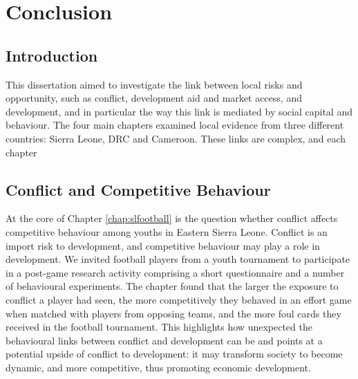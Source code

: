 \chapter{Conclusion}
\label{chap:conclusion}

\section{Introduction}
This dissertation aimed to investigate the link between local risks and opportunity, such as conflict, development aid and market access, and development, and in particular the way this link is mediated by social capital and behaviour. The four main chapters examined local evidence from three different countries: Sierra Leone, DRC and Cameroon. These links are complex, and each chapter






\section{Conflict and Competitive Behaviour}

At the core of Chapter \ref{chap:slfootball} is the question whether conflict affects competitive behaviour among youths in Eastern Sierra Leone. Conflict is an import risk to development, and competitive behaviour may play a role in development. We invited football players from a youth tournament to participate in a post-game research activity comprising a short questionnaire and a number of behavioural experiments. The chapter found that the larger the exposure to conflict a player had seen, the more competitively they behaved in an effort game when matched with players from opposing teams, and the more foul cards they received in the football tournament. This highlights how unexpected the behavioural links between conflict and development can be and points at a potential upside of conflict to development: it may transform society to become dynamic, and more competitive, thus promoting economic development.

